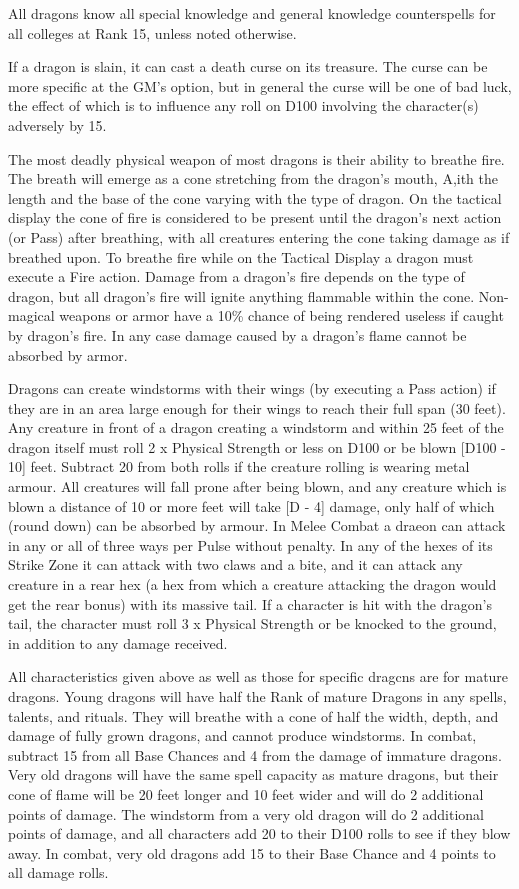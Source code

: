 \begin{multicols}{2}
All dragons know all special knowledge and general knowledge
counterspells for all colleges at Rank 15, unless noted otherwise.

If a dragon is slain, it can cast a death curse on its treasure.  The
curse can be more specific at the GM's option, but in general the
curse will be one of bad luck, the effect of which is to influence any
roll on D100 involving the character(s) adversely by 15.

The most deadly physical weapon of most dragons is their ability to
breathe fire. The breath will emerge as a cone stretching from the
dragon's mouth, A,ith the length and the base of the cone varying with
the type of dragon.  On the tactical display the cone of fire is
considered to be present until the dragon's next action (or Pass)
after breathing, with all creatures entering the cone taking damage as
if breathed upon.  To breathe fire while on the Tactical Display a
dragon must execute a Fire action.  Damage from a dragon's fire
depends on the type of dragon, but all dragon's fire will ignite
anything flammable within the cone.  Non-magical weapons or armor have
a 10\% chance of being rendered useless if caught by dragon's fire.  In
any case damage caused by a dragon's flame cannot be absorbed by
armor.

Dragons can create windstorms with their wings (by executing a Pass
action) if they are in an area large enough for their wings to reach
their full span (30 feet).  Any creature in front of a dragon creating
a windstorm and within 25 feet of the dragon itself must roll 2 x
Physical Strength or less on D100 or be blown [D100 - 10] feet.
Subtract 20 from both rolls if the creature rolling is wearing metal
armour.  All creatures will fall prone after being blown, and any
creature which is blown a distance of 10 or more feet will take [D -
4] damage, only half of which (round down) can be absorbed by armour.
In Melee Combat a draeon can attack in any or all of three ways per
Pulse without penalty.  In any of the hexes of its Strike Zone it can
attack with two claws and a bite, and it can attack any creature in a
rear hex (a hex from which a creature attacking the dragon would get
the rear bonus) with its massive tail.  If a character is hit with the
dragon's tail, the character must roll 3 x Physical Strength or be
knocked to the ground, in addition to any damage received.

All characteristics given above as well as those for specific dragcns
are for mature dragons.  Young dragons will have half the Rank of
mature Dragons in any spells, talents, and rituals.  They will breathe
with a cone of half the width, depth, and damage of fully grown
dragons, and cannot produce windstorms.  In combat, subtract 15 from
all Base Chances and 4 from the damage of immature dragons.  Very old
dragons will have the same spell capacity as mature dragons, but their
cone of flame will be 20 feet longer and 10 feet wider and will do 2
additional points of damage.  The windstorm from a very old dragon
will do 2 additional points of damage, and all characters add 20 to
their D100 rolls to see if they blow away.  In combat, very old
dragons add 15 to their Base Chance and 4 points to all damage rolls.


\end{multicols}
